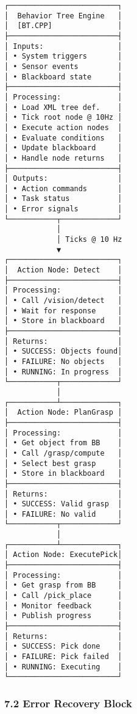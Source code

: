 \documentclass[
]{article}
\begin{document}
\begin{verbatim}
┌─────────────────────────┐
│  Behavior Tree Engine   │
│  [BT.CPP]               │
├─────────────────────────┤
│ Inputs:                 │
│ • System triggers       │
│ • Sensor events         │
│ • Blackboard state      │
├─────────────────────────┤
│ Processing:             │
│ • Load XML tree def.    │
│ • Tick root node @ 10Hz │
│ • Execute action nodes  │
│ • Evaluate conditions   │
│ • Update blackboard     │
│ • Handle node returns   │
├─────────────────────────┤
│ Outputs:                │
│ • Action commands       │
│ • Task status           │
│ • Error signals         │
└───────────┬─────────────┘
            │
            │ Ticks @ 10 Hz
            ▼
┌─────────────────────────┐
│  Action Node: Detect    │
├─────────────────────────┤
│ Processing:             │
│ • Call /vision/detect   │
│ • Wait for response     │
│ • Store in blackboard   │
├─────────────────────────┤
│ Returns:                │
│ • SUCCESS: Objects found│
│ • FAILURE: No objects   │
│ • RUNNING: In progress  │
└───────────┬─────────────┘
            │
┌───────────┴─────────────┐
│  Action Node: PlanGrasp │
├─────────────────────────┤
│ Processing:             │
│ • Get object from BB    │
│ • Call /grasp/compute   │
│ • Select best grasp     │
│ • Store in blackboard   │
├─────────────────────────┤
│ Returns:                │
│ • SUCCESS: Valid grasp  │
│ • FAILURE: No valid     │
└───────────┬─────────────┘
            │
┌───────────┴─────────────┐
│ Action Node: ExecutePick│
├─────────────────────────┤
│ Processing:             │
│ • Get grasp from BB     │
│ • Call /pick_place      │
│ • Monitor feedback      │
│ • Publish progress      │
├─────────────────────────┤
│ Returns:                │
│ • SUCCESS: Pick done    │
│ • FAILURE: Pick failed  │
│ • RUNNING: Executing    │
└─────────────────────────┘
\end{verbatim}

\hypertarget{error-recovery-block}{%
\subsubsection{7.2 Error Recovery Block}\label{error-recovery-block}}
\end{document}
